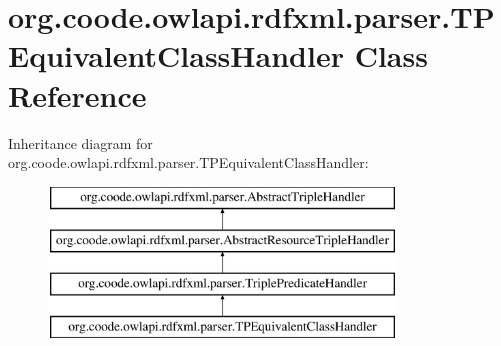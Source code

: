 \hypertarget{classorg_1_1coode_1_1owlapi_1_1rdfxml_1_1parser_1_1_t_p_equivalent_class_handler}{\section{org.\-coode.\-owlapi.\-rdfxml.\-parser.\-T\-P\-Equivalent\-Class\-Handler Class Reference}
\label{classorg_1_1coode_1_1owlapi_1_1rdfxml_1_1parser_1_1_t_p_equivalent_class_handler}
}
Inheritance diagram for org.\-coode.\-owlapi.\-rdfxml.\-parser.\-T\-P\-Equivalent\-Class\-Handler\-:\begin{figure}[H]
\begin{center}
\leavevmode
\includegraphics[height=4.000000cm]{classorg_1_1coode_1_1owlapi_1_1rdfxml_1_1parser_1_1_t_p_equivalent_class_handler}
\end{center}
\end{figure}
